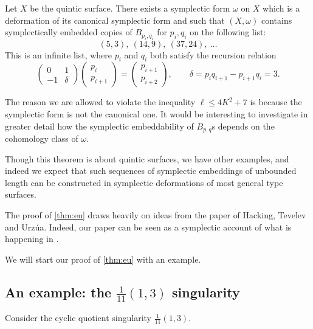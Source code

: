 \documentclass{article}
\begin{document}
\begin{Theorem}\label{thm:eu}
Let \(X\) be the quintic surface. There exists a symplectic form
\(\omega\) on \(X\) which is a deformation of its canonical
symplectic form and such that \((X,\omega)\) contains symplectically
embedded copies of \(B_{p_i,q_i}\) for \(p_i,q_i\) on the following
list: \[(5,3),\ (14,9),\ (37,24),\ \ldots\] This is an infinite
list, where \(p_i\) and \(q_i\) both satisfy the recursion relation
\[\begin{pmatrix} 0 & 1 \\ -1 & \delta\end{pmatrix}\begin{pmatrix}
p_i \\ p_{i+1}\end{pmatrix}=\begin{pmatrix} p_{i+1}
\\ p_{i+2}\end{pmatrix},\qquad\delta=p_iq_{i+1}-p_{i+1}q_i=3.\]


\end{Theorem}
The reason we are allowed to violate the inequality \(\ell\leq
4K^2+7\) is because the symplectic form is not the canonical one. It
would be interesting to investigate in greater detail how the
symplectic embeddability of \(B_{p,q}\)s depends on the cohomology
class of \(\omega\).


\begin{Remark}
Though this theorem is about quintic surfaces, we have other
examples, and indeed we expect that such sequences of symplectic
embeddings of unbounded length can be constructed in symplectic
deformations of most general type surfaces.


\end{Remark}
\begin{Remark}
The proof of \cref{thm:eu} draws heavily on ideas from the paper
\cite{HTU} of Hacking, Tevelev and Urz\'{u}a. Indeed, our paper
\cite{EU} can be seen as a symplectic account of what is happening
in \cite{HTU}.


\end{Remark}
We will start our proof of \cref{thm:eu} with an example.


\subsection{An example: the \(\frac{1}{11}(1,3)\) singularity}


Consider the
cyclic quotient singularity \(\frac{1}{11}(1,3)\).
\end{document}
